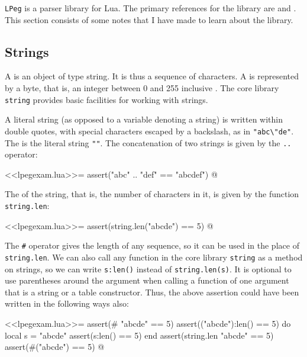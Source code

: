 \documentclass{article}
\begin{document}
\verb|LPeg| is a parser library for Lua.  The primary references for
the library are \textcite{bib:6whz1yt4} and \textcite{bib:rr7m3wo6}.
This section consists of some notes that I have made to learn about
the library.

\subsection{Strings}
\label{sec:hj8kx309}

A  is an object of type \textsf{string}.  It is thus
a sequence of characters.  A  is represented by a
byte, that is, an integer between 0 and 255 inclusive
\parencite[Section~2.1]{bib:x8gln9yb}.  The core library \verb|string|
provides basic facilities for working with strings.

A literal string (as opposed to a variable denoting a string) is
written within double quotes, with special characters escaped by a
backslash, as in \verb|"abc\"de"|.  The  is
the literal string \verb|""|.  The concatenation of two strings is
given by the \verb|..| operator:
\begin{codechunk}
<<lpegexam.lua>>=
assert("abc" .. "def" == "abcdef")
@
\end{codechunk}

The  of the string, that is, the number of
characters in it, is given by the function \verb|string.len|:
\begin{codechunk}
<<lpegexam.lua>>=
assert(string.len("abcde") == 5)
@
\end{codechunk}

The \verb|#| operator gives the length of any sequence, so it can be
used in the place of \verb|string.len|.  We can also call any function
in the core library \verb|string| as a method on strings, so we can
write \verb|s:len()| instead of \verb|string.len(s)|.  It is optional
to use parentheses around the argument when calling a function of one
argument that is a string or a table constructor.  Thus, the above
assertion could have been written in the following ways also:
\begin{codechunk}
<<lpegexam.lua>>=
assert(# "abcde" == 5)
assert(("abcde"):len() == 5)
do
  local s = "abcde"
  assert(s:len() == 5)
end
assert(string.len "abcde" == 5)
assert(#("abcde") == 5)
@
\end{codechunk}
\end{document}
